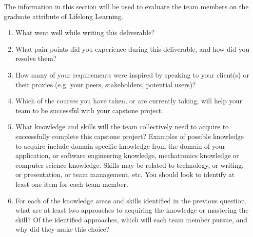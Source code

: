\documentclass{scrreprt}
\theoremstyle{definition}
\begin{document}
The information in this section will be used to evaluate the team members on the
graduate attribute of Lifelong Learning.  

% 

\begin{enumerate}
  \item What went well while writing this deliverable? 
  \item What pain points did you experience during this deliverable, and how did
  you resolve them?
  \item How many of your requirements were inspired by speaking to your
  client(s) or their proxies (e.g. your peers, stakeholders, potential users)?
  \item Which of the courses you have taken, or are currently taking, will help
  your team to be successful with your capstone project.
  \item What knowledge and skills will the team collectively need to acquire to
  successfully complete this capstone project?  Examples of possible knowledge
  to acquire include domain specific knowledge from the domain of your
  application, or software engineering knowledge, mechatronics knowledge or
  computer science knowledge.  Skills may be related to technology, or writing,
  or presentation, or team management, etc.  You should look to identify at
  least one item for each team member.
  \item For each of the knowledge areas and skills identified in the previous
  question, what are at least two approaches to acquiring the knowledge or
  mastering the skill?  Of the identified approaches, which will each team
  member pursue, and why did they make this choice?
\end{enumerate}


\end{document}
